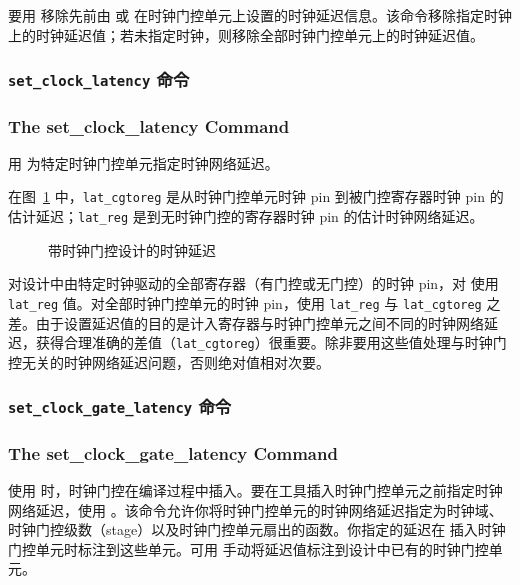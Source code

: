 要用  移除先前由  或  在时钟门控单元上设置的时钟延迟信息。该命令移除指定时钟上的时钟延迟值；若未指定时钟，则移除全部时钟门控单元上的时钟延迟值。

\subsubsection{\texttt{set\_clock\_latency} 命令}
\subsubsection*{The set\_clock\_latency Command}

用  为特定时钟门控单元指定时钟网络延迟。

在图~\ref{fig:clk-lat-cg} 中，\texttt{lat\_cgtoreg} 是从时钟门控单元时钟 pin 到被门控寄存器时钟 pin 的估计延迟；\texttt{lat\_reg} 是到无时钟门控的寄存器时钟 pin 的估计时钟网络延迟。

\begin{figure}[htbp]
\centering
{}
\caption{带时钟门控设计的时钟延迟}
\label{fig:clk-lat-cg}
\end{figure}

对设计中由特定时钟驱动的全部寄存器（有门控或无门控）的时钟 pin，对  使用 \texttt{lat\_reg} 值。对全部时钟门控单元的时钟 pin，使用 \texttt{lat\_reg} 与 \texttt{lat\_cgtoreg} 之差。由于设置延迟值的目的是计入寄存器与时钟门控单元之间不同的时钟网络延迟，获得合理准确的差值（\texttt{lat\_cgtoreg}）很重要。除非要用这些值处理与时钟门控无关的时钟网络延迟问题，否则绝对值相对次要。

\subsubsection{\texttt{set\_clock\_gate\_latency} 命令}
\subsubsection*{The set\_clock\_gate\_latency Command}

使用  时，时钟门控在编译过程中插入。要在工具插入时钟门控单元之前指定时钟网络延迟，使用 。该命令允许你将时钟门控单元的时钟网络延迟指定为时钟域、时钟门控级数（stage）以及时钟门控单元扇出的函数。你指定的延迟在  插入时钟门控单元时标注到这些单元。可用  手动将延迟值标注到设计中已有的时钟门控单元。


